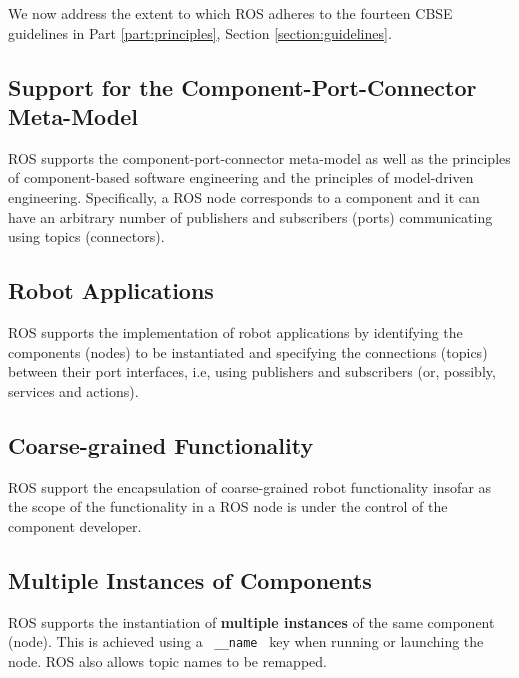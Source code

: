 \documentclass{CSSRforAfrica}
\begin{document}
We now address the extent to which ROS adheres to the fourteen CBSE guidelines in Part \ref{part:principles}, Section \ref{section:guidelines}.

\subsection{Support for the Component-Port-Connector Meta-Model}
ROS supports the {component-port-connector} meta-model as well as the principles of component-based software engineering and the principles of model-driven engineering.  Specifically, a ROS node corresponds to a component and it can have an arbitrary number of publishers and subscribers (ports) communicating using topics (connectors).

\subsection{Robot Applications}

ROS supports the implementation of  {robot applications} by identifying the components (nodes) to be instantiated and specifying the connections (topics) between their port interfaces, i.e, using publishers and subscribers (or, possibly, services and actions).  

\subsection{Coarse-grained Functionality}

ROS support the encapsulation of  { coarse-grained} robot functionality insofar as the scope of the functionality in a ROS node is under the control of the component developer.  

\subsection{Multiple Instances of Components}

ROS supports the instantiation of {\bf multiple instances} of the same component (node). This is achieved using a {\small 
\verb+ __name +} key when running or launching the node.  ROS also allows topic names to be remapped.
 
\end{document}

